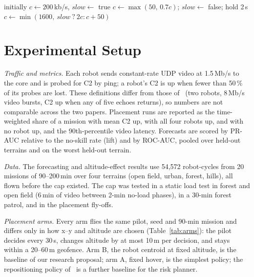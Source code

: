 \begin{algorithm}[t]
\caption{Per-Robot Uplink Cap (Every 0.2\,s)}
\label{alg:cap}
\begin{algorithmic}[1]
\small
\STATE initially $c \leftarrow 200$\,kb/s, $\mathit{slow} \leftarrow$ true
  \STATE $c \leftarrow \max(50,\,0.7c)$; $\mathit{slow} \leftarrow$ false; hold 2\,s
  \STATE $c \leftarrow \min(1600,\ \mathit{slow}\ ?\ 2c : c + 50)$
\ENDIF
\end{algorithmic}
\end{algorithm}
\section{Experimental Setup}
\label{sec:setup}

\textit{Traffic and metrics.} Each robot sends constant-rate UDP video at
1.5\,Mb/s to the core and is probed for C2 by ping; a robot's C2 is up when
fewer than 50\,\% of its probes are lost. These definitions differ from those
of~\cite{makhubela2026satnac} (two robots, 8\,Mb/s video bursts, C2 up when
any of five echoes returns), so numbers are not comparable across the two
papers. Placement runs are reported as the time-weighted share of a mission
with mean C2 up, with all four robots up, and with no robot up, and the
90th-percentile video latency. Forecasts are scored by PR-AUC relative to the
no-skill rate (lift) and by ROC-AUC, pooled over held-out terrains and on the
worst held-out terrain.

\textit{Data.} The forecasting and altitude-effect results use 54,572
robot-cycles from 20 missions of 90--200\,min over four terrains (open field,
urban, forest, hills), all flown before the cap existed. The cap was tested in
a static load test in forest and open field (6\,min of video between 2-min
no-load phases), in a 30-min forest patrol, and in the placement fly-offs.

\textit{Placement arms.} Every arm flies the same pilot, seed and 90-min
mission and differs only in how x--y and altitude are chosen
(Table~\ref{tab:arms}): the pilot decides every 30\,s, changes altitude by at
most 10\,m per decision, and stays within a 20--60\,m geofence. Arm B, the
robot centroid at fixed altitude, is the baseline of our research proposal; arm
A, fixed hover, is the simplest policy; the repositioning policy
of~\cite{makhubela2026satnac} is a further baseline for the risk planner.

